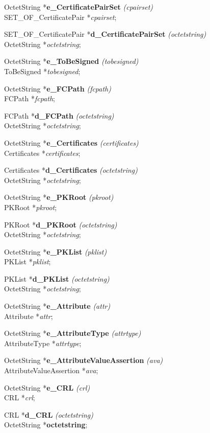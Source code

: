 OctetString *{\bf e\_CertificatePairSet} {\em (cpairset)} \\
SET\_OF\_CertificatePair *{\em cpairset};

SET\_OF\_CertificatePair *{\bf d\_CertificatePairSet} {\em (octetstring)} \\
OctetString *{\em octetstring};

OctetString *{\bf e\_ToBeSigned} {\em (tobesigned)} \\
ToBeSigned *{\em tobesigned};

OctetString *{\bf e\_FCPath} {\em (fcpath)} \\
FCPath *{\em fcpath};

FCPath *{\bf d\_FCPath} {\em (octetstring)} \\
OctetString *{\em octetstring};

OctetString *{\bf e\_Certificates} {\em (certificates)} \\
Certificates *{\em certificates};

Certificates *{\bf d\_Certificates} {\em (octetstring)} \\
OctetString *{\em octetstring};

OctetString *{\bf e\_PKRoot} {\em (pkroot)} \\
PKRoot *{\em pkroot};

PKRoot *{\bf d\_PKRoot} {\em (octetstring)} \\
OctetString *{\em octetstring};

OctetString *{\bf e\_PKList} {\em (pklist)} \\
PKList *{\em pklist};

PKList *{\bf d\_PKList} {\em (octetstring)} \\
OctetString *{\em octetstring};

OctetString *{\bf e\_Attribute} {\em (attr)} \\
Attribute *{\em attr};

OctetString *{\bf e\_AttributeType} {\em (attrtype)} \\
AttributeType *{\em attrtype};

OctetString *{\bf e\_AttributeValueAssertion} {\em (ava)} \\
AttributeValueAssertion *{\em ava};

OctetString *{\bf e\_CRL} {\em (crl)} \\
CRL *{\em crl};

CRL *{\bf d\_CRL} {\em (octetstring)} \\
OctetString *{\bf octetstring};


